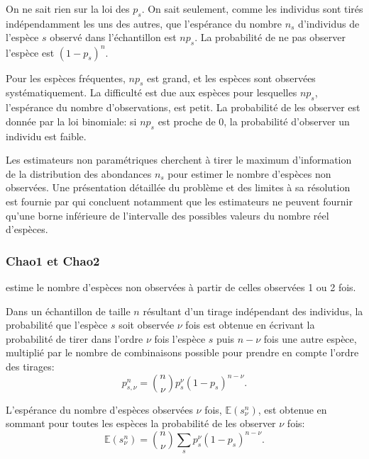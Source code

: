 \documentclass[
  11pt,
  french,
  a4paper,
  extrafontsizes,onecolumn,openright
  ]{memoir}
\begin{document}
On ne sait rien sur la loi des \(p_s\).
On sait seulement, comme les individus sont tirés indépendamment les uns des autres, que l'espérance du nombre \(n_s\) d'individus de l'espèce \(s\) observé dans l'échantillon est \(np_s\).
La probabilité de ne pas observer l'espèce est \((1-p_s)^n\).

Pour les espèces fréquentes, \(np_s\) est grand, et les espèces sont observées systématiquement.
La difficulté est due aux espèces pour lesquelles \(np_s\), l'espérance du nombre d'observations, est petit.
La probabilité de les observer est donnée par la loi binomiale: si \(np_s\) est proche de 0, la probabilité d'observer un individu est faible.

Les estimateurs non paramétriques cherchent à tirer le maximum d'information de la distribution des abondances \(n_s\) pour estimer le nombre d'espèces non observées.
Une présentation détaillée du problème et des limites à sa résolution est fournie par \textcite{Mao2005} qui concluent notamment que les estimateurs ne peuvent fournir qu'une borne inférieure de l'intervalle des possibles valeurs du nombre réel d'espèces.

\hypertarget{chao1-et-chao2}{%
\subsubsection{Chao1 et Chao2}\label{chao1-et-chao2}}

\textcite{Chao1984} estime le nombre d'espèces non observées à partir de celles observées 1 ou 2 fois.

Dans un échantillon de taille \(n\) résultant d'un tirage indépendant des individus, la probabilité que l'espèce \(s\) soit observée \(\nu\) fois est obtenue en écrivant la probabilité de tirer dans l'ordre \(\nu\) fois l'espèce \(s\) puis \(n-\nu\) fois une autre espèce, multiplié par le nombre de combinaisons possible pour prendre en compte l'ordre des tirages:
\begin{equation}
  \label{eq:psnu}
  p^{n}_{s, \nu} = \binom{n}{\nu} {p_s^\nu \left( 1-p_s \right)^{n-\nu}}.
\end{equation}

L'espérance du nombre d'espèces observées \(\nu\) fois, \({\mathbb E}(s^{n}_{\nu})\), est obtenue en sommant pour toutes les espèces la probabilité de les observer \(\nu\) fois:
\begin{equation}
  \label{eq:Esnnu}
  {\mathbb E}\left( s^{n}_{\nu} \right) = \binom{n}{\nu} \sum_s{p_s^\nu \left( 1-p_s \right)^{n-\nu}}.
\end{equation}
\end{document}
